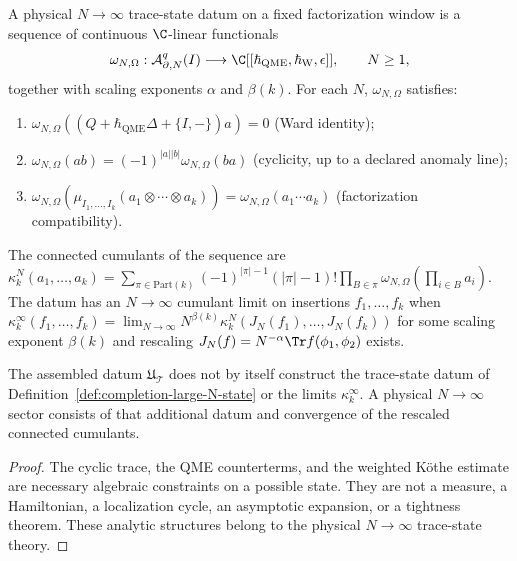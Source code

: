 \begin{defn}
\label{def:completion-large-N-state}
A physical \(N\to\infty\) trace-state datum on a fixed factorization window is a
sequence of continuous \(\C\)-linear functionals
\[
  \omega_{N,\Omega}:\mathcal A^q_{\partial,N}(I)\longrightarrow
  \C[[\hbar_{\mathrm{QME}},\hbar_{\mathrm{W}},\epsilon]],
  \qquad N\ge1,
\]
together with scaling exponents \(\alpha\) and \(\beta(k)\).  For each
\(N\), \(\omega_{N,\Omega}\) satisfies:
\begin{enumerate}
\item \(\omega_{N,\Omega}((Q+\hbar_{\mathrm{QME}}\Delta+\{I,-\})a)=0\)
  (Ward identity);
\item \(\omega_{N,\Omega}(ab)=(-1)^{|a||b|}\omega_{N,\Omega}(ba)\)
  (cyclicity, up to a declared anomaly line);
\item
  \(\omega_{N,\Omega}(\mu_{I_1,\ldots,I_k}(a_1\otimes\cdots\otimes a_k))
   =\omega_{N,\Omega}(a_1\cdots a_k)\)
  (factorization compatibility).
\end{enumerate}
The connected cumulants of the sequence are
\(\kappa^N_k(a_1,\ldots,a_k)=\sum_{\pi\in\mathrm{Part}(k)}
(-1)^{|\pi|-1}(|\pi|-1)!\prod_{B\in\pi}\omega_{N,\Omega}
(\prod_{i\in B}a_i)\).  The datum has an \(N\to\infty\) cumulant limit on insertions
\(f_1,\ldots,f_k\) when
\(\kappa^\infty_k(f_1,\ldots,f_k)=\lim_{N\to\infty}N^{\beta(k)}
\kappa^N_k(J_N(f_1),\ldots,J_N(f_k))\) for some scaling exponent
\(\beta(k)\) and rescaling \(J_N(f)=N^{-\alpha}\Tr f(\phi_1,\phi_2)\)
exists.
\end{defn}

\begin{thm}
\label{thm:completion-large-N}
The assembled datum \(\mathfrak U_{\mathcal T}\) does not by itself
construct the trace-state datum of
Definition~\ref{def:completion-large-N-state} or the limits
\(\kappa^\infty_k\).  A physical \(N\to\infty\) sector consists of that
additional datum and convergence of the rescaled connected cumulants.
\end{thm}

\begin{proof}
The cyclic trace, the QME counterterms, and the weighted Köthe
estimate are necessary algebraic constraints on a possible state.
They are not a measure, a Hamiltonian, a localization cycle,
an asymptotic expansion, or a tightness theorem.  These analytic
structures belong to the physical \(N\to\infty\) trace-state theory.
\end{proof}

